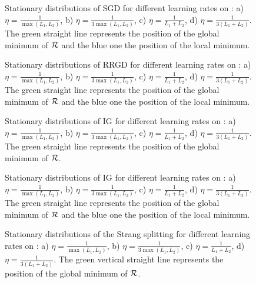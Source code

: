 \documentclass[article,authoryear,jmlmc]{beg_32}             %
\begin{document}
\begin{figure}[h!]
	\centering
	\scalebox{0.60}{}
	\caption{Stationary distributions of SGD for different learning rates on \exTwo: a) $\eta=\frac{1}{\max(L_1,L_2)}$, b) $\eta=\frac{1}{3\max(L_1,L_2)}$, c) $\eta=\frac{1}{L_1+L_2}$, d) $\eta=\frac{1}{3(L_1+L_2)}$. The green straight line represents the position of the global minimum of $\mathcal{R}$ and the blue one the position of the local minimum.}
	\label{sgd_ex2}
\end{figure}

\begin{figure}[h!]
	\centering
	\scalebox{0.60}{}
	\caption{Stationary distributions of RRGD for different learning rates on \exTwo: a) $\eta=\frac{1}{\max(L_1,L_2)}$, b) $\eta=\frac{1}{3\max(L_1,L_2)}$, c) $\eta=\frac{1}{L_1+L_2}$, d) $\eta=\frac{1}{3(L_1+L_2)}$. The green straight line represents the position of the global minimum of $\mathcal{R}$ and the blue one the position of the local minimum.}
	\label{RRGD_ex2}
\end{figure}



\begin{figure}[h!]
	\centering
	\scalebox{0.60}{}
	\caption{Stationary distributions of IG for different learning rates on \exOne: a) $\eta=\frac{1}{\max(L_1,L_2)}$, b) $\eta=\frac{1}{3\max(L_1,L_2)}$, c) $\eta=\frac{1}{L_1+L_2}$, d) $\eta=\frac{1}{3(L_1+L_2)}$. The green straight line represents the position of the global minimum of $\mathcal{R}$.}
	\label{IG_ex1}
\end{figure}

\begin{figure}[h!]
	\centering
	\scalebox{0.60}{}
	\caption{Stationary distributions of IG for different learning rates on \exTwo: a) $\eta=\frac{1}{\max(L_1,L_2)}$, b) $\eta=\frac{1}{3\max(L_1,L_2)}$, c) $\eta=\frac{1}{L_1+L_2}$, d) $\eta=\frac{1}{3(L_1+L_2)}$. The green straight line represents the position of the global minimum of $\mathcal{R}$ and the blue one the position of the local minimum.}
	\label{IG_ex2}
\end{figure}

\begin{figure}[h!]
	\centering
	\scalebox{0.60}{}
	\caption{Stationary distributions of the Strang splitting for different learning rates on \exOne: a) $\eta=\frac{1}{\max(L_1,L_2)}$, b) $\eta=\frac{1}{3\max(L_1,L_2)}$, c) $\eta=\frac{1}{L_1+L_2}$, d) $\eta=\frac{1}{3(L_1+L_2)}$. The green vertical straight line represents the position of the global minimum of $\mathcal{R}$.}
	\label{Strang_ex1}
\end{figure}
\end{document}
